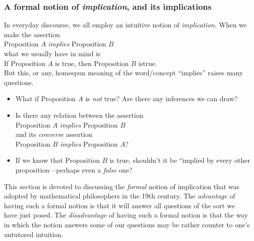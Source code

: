 \subsubsection{A formal notion of {\em implication}, and its
  implications}
\label{sec:implication}

In everyday discourse, we all employ an intuitive notion of {\it implication}.
When we make the assertion \\
\hspace*{.35in}Proposition $A$ {\it implies} Proposition $B$ \\
what we usually have in mind is \\
\hspace*{.35in}If Proposition $A$ is true, then Proposition $B$ istrue. \\
But this, or any, homespun meaning of the word/concept ``implies''
raises many questions.
\begin{itemize}
\item
What if Proposition $A$ is {\em not} true?  Are there any inferences
we can draw?

\item
Is there any relation between the assertion \\
\hspace*{.35in}Proposition $A$ {\it implies} Proposition $B$ \\
and its {\it converse}
assertion \\
\hspace*{.35in}Proposition $B$ {\it implies} Proposition $A$?

\item
If we know that Proposition $B$ is true, shouldn't it be ``implied by
every other proposition---perhaps even a {\em false} one?
\end{itemize}
This section is devoted to discussing the {\em formal} notion of
implication
%
that was adopted by mathematical philosophers in the 19th century.
The {\em advantage} of having such a formal notion is that it will
answer all questions of the sort we have just posed.  The {\em
  disadvantage} of having such a formal notion is that the way in
which the notion answers some of our questions may be rather counter
to one's untutored intuition.

